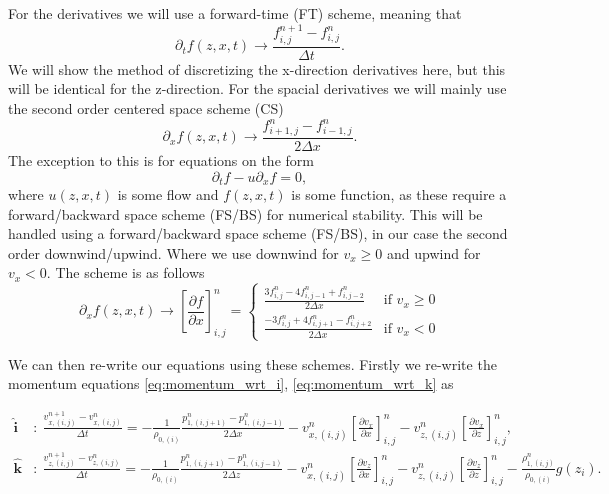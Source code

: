 \documentclass{article}
\begin{document}
For the derivatives we will use a forward-time (FT) scheme, meaning that
\begin{equation}
    \partial_t f(z,x,t) \rightarrow \frac{f_{i,j}^{n+1}-f_{i,j}^n}{\Delta t}.
\end{equation}
We will show the method of discretizing the x-direction derivatives here, but this will be identical for the z-direction. For the spacial derivatives we will mainly use the second order centered space scheme (CS)
\begin{equation}
    \partial_x f(z,x,t) \rightarrow \frac{f_{i+1,j}^n-f_{i-1,j}^n}{2\Delta x}.
\end{equation}
The exception to this is for equations on the form
\begin{equation}
    \partial_t f - u\partial_x f=0,
\end{equation}
where $u(z,x,t)$ is some flow and $f(z,x,t)$ is some function, as these require a forward/backward space scheme (FS/BS) for numerical stability. This will be handled using a forward/backward space scheme (FS/BS), in our case the second order downwind/upwind. Where we use downwind for $v_x \geq 0$ and upwind for $v_x<0$. The scheme is as follows
\begin{equation}
    \partial_x f(z,x,t) \rightarrow \left[\frac{\partial f}{\partial x} \right]_{i,j}^n= 
    \begin{cases} 
        \frac{3f_{i,j}^n-4f_{i,j-1}^n+f_{i,j-2}^n}{2\Delta x} & \text{if } v_x \geq 0 \\
        \frac{-3f_{i,j}^n+4f_{i,j+1}^n-f_{i,j+2}^n}{2\Delta x} & \text{if } v_x < 0 
    \end{cases}
\end{equation}

We can then re-write our equations using these schemes. Firstly we re-write the momentum equations \ref{eq:momentum_wrt_i}, \ref{eq:momentum_wrt_k} as

\begin{align}
    \mathbf{\hat{i}}&:\ \frac{v_{x,(i,j)}^{n+1}-v_{x,(i,j)}^{n}}{\Delta t} = -\frac{1}{\rho_{0,(i)}}\frac{p_{1,(i,j+1)}^n - p_{1,(i,j-1)}^n}{2\Delta x} - v_{x,(i,j)}^n \left[\frac{\partial v_{x}}{\partial x}\right]_{i,j}^n - v_{z,(i,j)}^n \left[\frac{\partial v_{x}}{\partial z}\right]_{i,j}^n, \\
    \mathbf{\hat{k}}&:\ \frac{v_{z,(i,j)}^{n+1}-v_{z,(i,j)}^{n}}{\Delta t} = -\frac{1}{\rho_{0,(i)}}\frac{p_{1,(i,j+1)}^n - p_{1,(i,j-1)}^n}{2\Delta z} - v_{x,(i,j)}^n \left[\frac{\partial v_{z}}{\partial x}\right]_{i,j}^n - v_{z,(i,j)}^n \left[\frac{\partial v_{z}}{\partial z}\right]_{i,j}^n - \frac{\rho_{1,(i,j)}^n}{\rho_{0,(i)}}g(z_i).
\end{align}
\end{document}
